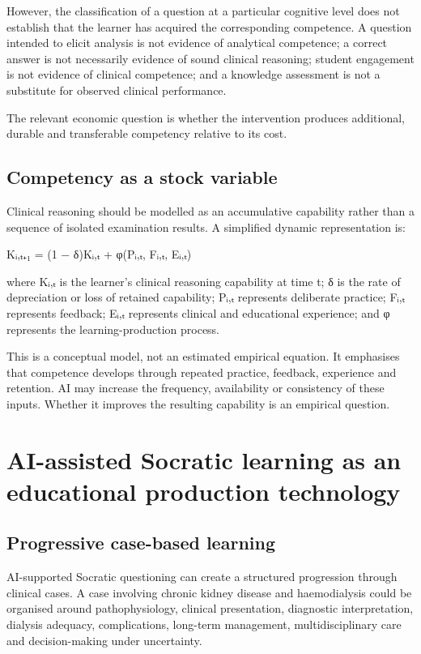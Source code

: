 \documentclass[11pt,a4paper]{article}
\begin{document}
However, the classification of a question at a particular cognitive level does not establish that the learner has acquired the corresponding competence. A question intended to elicit analysis is not evidence of analytical competence; a correct answer is not necessarily evidence of sound clinical reasoning; student engagement is not evidence of clinical competence; and a knowledge assessment is not a substitute for observed clinical performance.

The relevant economic question is whether the intervention produces additional, durable and transferable competency relative to its cost.

\subsection{Competency as a stock variable}
Clinical reasoning should be modelled as an accumulative capability rather than a sequence of isolated examination results. A simplified dynamic representation is:

Kᵢ,ₜ₊₁ = (1 − δ)Kᵢ,ₜ + φ(Pᵢ,ₜ, Fᵢ,ₜ, Eᵢ,ₜ)

where Kᵢ,ₜ is the learner's clinical reasoning capability at time t; δ is the rate of depreciation or loss of retained capability; Pᵢ,ₜ represents deliberate practice; Fᵢ,ₜ represents feedback; Eᵢ,ₜ represents clinical and educational experience; and φ represents the learning-production process.

This is a conceptual model, not an estimated empirical equation. It emphasises that competence develops through repeated practice, feedback, experience and retention. AI may increase the frequency, availability or consistency of these inputs. Whether it improves the resulting capability is an empirical question.

\section{AI-assisted Socratic learning as an educational production technology}
\subsection{Progressive case-based learning}
AI-supported Socratic questioning can create a structured progression through clinical cases. A case involving chronic kidney disease and haemodialysis could be organised around pathophysiology, clinical presentation, diagnostic interpretation, dialysis adequacy, complications, long-term management, multidisciplinary care and decision-making under uncertainty.
\end{document}
